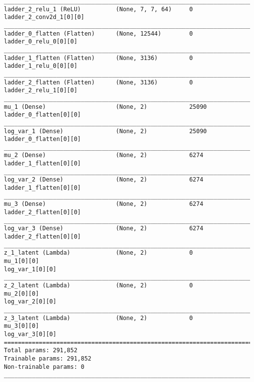 \begin{lstlisting}[caption={Initial \ac{VLAE} network encoder used for network sparsity experiments},captionpos=b,basicstyle=\tiny, label={lst:sparsity-vlae-encoder-28-fm1}]
__________________________________________________________________________________________________
ladder_2_relu_1 (ReLU)          (None, 7, 7, 64)     0           ladder_2_conv2d_1[0][0]
__________________________________________________________________________________________________
ladder_0_flatten (Flatten)      (None, 12544)        0           ladder_0_relu_0[0][0]
__________________________________________________________________________________________________
ladder_1_flatten (Flatten)      (None, 3136)         0           ladder_1_relu_0[0][0]
__________________________________________________________________________________________________
ladder_2_flatten (Flatten)      (None, 3136)         0           ladder_2_relu_1[0][0]
__________________________________________________________________________________________________
mu_1 (Dense)                    (None, 2)            25090       ladder_0_flatten[0][0]
__________________________________________________________________________________________________
log_var_1 (Dense)               (None, 2)            25090       ladder_0_flatten[0][0]
__________________________________________________________________________________________________
mu_2 (Dense)                    (None, 2)            6274        ladder_1_flatten[0][0]
__________________________________________________________________________________________________
log_var_2 (Dense)               (None, 2)            6274        ladder_1_flatten[0][0]
__________________________________________________________________________________________________
mu_3 (Dense)                    (None, 2)            6274        ladder_2_flatten[0][0]
__________________________________________________________________________________________________
log_var_3 (Dense)               (None, 2)            6274        ladder_2_flatten[0][0]
__________________________________________________________________________________________________
z_1_latent (Lambda)             (None, 2)            0           mu_1[0][0]
log_var_1[0][0]
__________________________________________________________________________________________________
z_2_latent (Lambda)             (None, 2)            0           mu_2[0][0]
log_var_2[0][0]
__________________________________________________________________________________________________
z_3_latent (Lambda)             (None, 2)            0           mu_3[0][0]
log_var_3[0][0]
==================================================================================================
Total params: 291,852
Trainable params: 291,852
Non-trainable params: 0
__________________________________________________________________________________________________
\end{lstlisting}